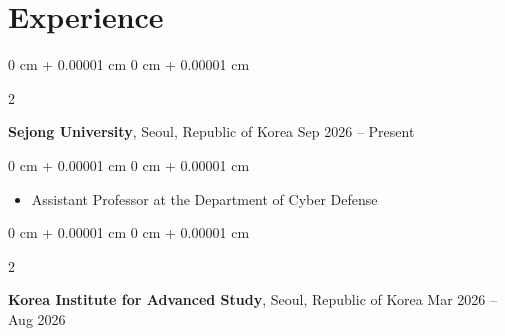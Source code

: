 \documentclass[10pt, letterpaper]{article}
\newenvironment{highlights}{
    \begin{itemize}[
        topsep=0.10 cm,
        parsep=0.10 cm,
        partopsep=0pt,
        itemsep=0pt,
        leftmargin=0 cm + 10pt
    ]
}{
    \end{itemize}
} %
\newenvironment{highlightsforbulletentries}{
    \begin{itemize}[
        topsep=0.10 cm,
        parsep=0.10 cm,
        partopsep=0pt,
        itemsep=0pt,
        leftmargin=10pt
    ]
}{
    \end{itemize}
} %
\newenvironment{onecolentry}{
    \begin{adjustwidth}{
        0 cm + 0.00001 cm
    }{
        0 cm + 0.00001 cm
    }
}{
    \end{adjustwidth}
} %
\newenvironment{twocolentry}[2][]{
    \onecolentry
    \def\secondColumn{#2}
    \setcolumnwidth{\fill, 4.5 cm}
    \begin{paracol}{2}
}{
    \switchcolumn \raggedleft \secondColumn
    \end{paracol}
    \endonecolentry
} %
\begin{document}
    









    \section{Experience}

        \begin{twocolentry}{
            Sep 2026 – Present
        }
            \textbf{Sejong University}, Seoul, Republic of Korea\end{twocolentry}

        \vspace{0.10 cm}
        \begin{onecolentry}
            \begin{highlights}
                \item Assistant Professor at the Department of Cyber Defense
            \end{highlights}
        \end{onecolentry}

        \vspace{0.2 cm}

        \begin{twocolentry}{
            Mar 2026 – Aug 2026
        }
            \textbf{Korea Institute for Advanced Study}, Seoul, Republic of Korea\end{twocolentry}
\end{document}

